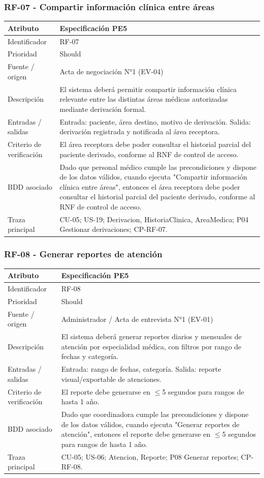 \documentclass[11pt,a4paper]{article}
\begin{document}
	\subsubsection{RF-07 - Compartir información clínica entre áreas}
	\begin{tabularx}{\textwidth}{p{3.2cm}Y}
		\toprule
		\textbf{Atributo} & \textbf{Especificación PE5}\\\midrule
		Identificador & RF-07\\
		Prioridad & Should\\
		Fuente / origen & Acta de negociación N°1 (EV-04)\\
		Descripción & El sistema deberá permitir compartir información clínica relevante entre las distintas áreas médicas autorizadas mediante derivación formal.\\
		Entradas / salidas & Entrada: paciente, área destino, motivo de derivación. Salida: derivación registrada y notificada al área receptora.\\
		Criterio de verificación & El área receptora debe poder consultar el historial parcial del paciente derivado, conforme al RNF de control de acceso.\\
		BDD asociado & Dado que personal médico cumple las precondiciones y dispone de los datos válidos, cuando ejecuta "Compartir información clínica entre áreas", entonces el área receptora debe poder consultar el historial parcial del paciente derivado, conforme al RNF de control de acceso.\\
		Traza principal & CU-05; US-19; Derivacion, HistoriaClinica, AreaMedica; P04 Gestionar derivaciones; CP-RF-07.\\
		\bottomrule
	\end{tabularx}
	\subsubsection{RF-08 - Generar reportes de atención}
	\begin{tabularx}{\textwidth}{p{3.2cm}Y}
		\toprule
		\textbf{Atributo} & \textbf{Especificación PE5}\\\midrule
		Identificador & RF-08\\
		Prioridad & Should\\
		Fuente / origen & Administrador / Acta de entrevista N°1 (EV-01)\\
		Descripción & El sistema deberá generar reportes diarios y mensuales de atención por especialidad médica, con filtros por rango de fechas y categoría.\\
		Entradas / salidas & Entrada: rango de fechas, categoría. Salida: reporte visual/exportable de atenciones.\\
		Criterio de verificación & El reporte debe generarse en $\leq$5 segundos para rangos de hasta 1 año.\\
		BDD asociado & Dado que coordinadora cumple las precondiciones y dispone de los datos válidos, cuando ejecuta "Generar reportes de atención", entonces el reporte debe generarse en $\leq$5 segundos para rangos de hasta 1 año.\\
		Traza principal & CU-05; US-06; Atencion, Reporte; P08 Generar reportes; CP-RF-08.\\
		\bottomrule
	\end{tabularx}
	\clearpage
\end{document}
